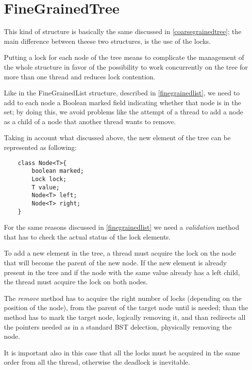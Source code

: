 \section{FineGrainedTree}
\label{finegrainedtree}

This kind of structure is basically the same discussed in \ref{coarsegrainedtree}; the main difference between theese two structures, is the use of the locks.

Putting a lock for each node of the tree means to complicate the management of the whole structure in favor of the possibility to work concurrently on the tree for more than one thread and reduces lock contention.
\newline 

Like in the FineGrainedList structure, described in \ref{finegrainedlist}, we need to add to each node a Boolean marked field indicating whether that node is in the set; by doing this, we avoid problems like the attempt of a thread to add a node as a child of a node that another thread wants to remove.
\newline

Taking in account what discussed above, the new element of the tree can be represented as following:\newline

\begin{lstlisting}
	class Node<T>{
		boolean marked;
		Lock lock;
		T value;
		Node<T> left;
		Node<T> right;
	}
\end{lstlisting}

For the same reasons discussed in \ref{finegrainedlist} we need a \emph{validation} method that has to check the actual status of the lock elements.
\newline

To add a new element in the tree, a thread must acquire the lock on the node that will become the parent of the new node.
If the new element is already present in the tree and if the node with the same value already has a left child, the thread must acquire the lock on both nodes.
\newline

The \emph{remove} method has to acquire the right number of locks (depending on the position of the node), from the parent of the target node until is needed;
than the method has to mark the target node, logically removing it, and than redirects all the pointers needed as in a standard BST delection, physically removing the node.

It is important also in this case that all the locks must be acquired in the same order from all the thread, otherwise the deadlock is inevitable.

